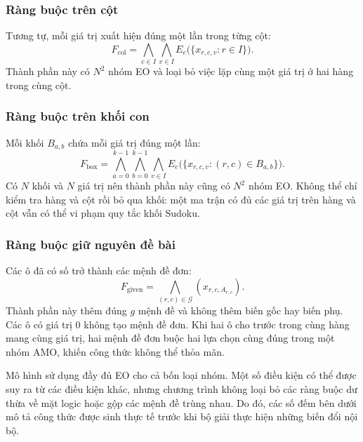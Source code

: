 \documentclass[a4paper,fleqn]{cas-sc}
\begin{document}
\subsubsection{Ràng buộc trên cột}

Tương tự, mỗi giá trị xuất hiện đúng một lần trong từng cột:
\begin{equation}
 F_{\mathrm{col}}=
 \bigwedge_{c\in I}\bigwedge_{v\in I}
 E_e\bigl(\{x_{r,c,v}:r\in I\}\bigr).
 \label{eq:method-column}
\end{equation}
Thành phần này có $N^2$ nhóm EO và loại bỏ việc lặp cùng một giá trị
ở hai hàng trong cùng cột.

\subsubsection{Ràng buộc trên khối con}

Mỗi khối $B_{a,b}$ chứa mỗi giá trị đúng một lần:
\begin{equation}
 F_{\mathrm{box}}=
 \bigwedge_{a=0}^{k-1}\bigwedge_{b=0}^{k-1}\bigwedge_{v\in I}
 E_e\bigl(\{x_{r,c,v}:(r,c)\in B_{a,b}\}\bigr).
 \label{eq:method-box}
\end{equation}
Có $N$ khối và $N$ giá trị nên thành phần này cũng có $N^2$ nhóm EO.
Không thể chỉ kiểm tra hàng và cột rồi bỏ qua khối: một ma trận có đủ
các giá trị trên hàng và cột vẫn có thể vi phạm quy tắc khối Sudoku.

\subsubsection{Ràng buộc giữ nguyên đề bài}

Các ô đã có số trở thành các mệnh đề đơn:
\begin{equation}
 F_{\mathrm{given}}=
 \bigwedge_{(r,c)\in\mathcal{G}}(x_{r,c,A_{r,c}}).
 \label{eq:method-givens}
\end{equation}
Thành phần này thêm đúng $g$ mệnh đề và không thêm biến gốc hay biến phụ.
Các ô có giá trị $0$ không tạo mệnh đề đơn. Khi hai ô cho trước trong
cùng hàng mang cùng giá trị, hai mệnh đề đơn buộc hai lựa chọn cùng
đúng trong một nhóm AMO, khiến công thức không thể thỏa mãn.

Mô hình sử dụng đầy đủ EO cho cả bốn loại nhóm. Một số điều kiện có thể
được suy ra từ các điều kiện khác, nhưng chương trình không loại bỏ các
ràng buộc dư thừa về mặt logic hoặc gộp các mệnh đề trùng nhau.
Do đó, các số đếm bên dưới mô tả công thức được sinh thực tế trước khi
bộ giải thực hiện những biến đổi nội bộ.
\end{document}
